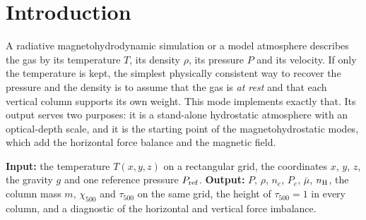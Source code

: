 


\begin{abstract}
\noindent Given the temperature of a three-dimensional piece of the solar atmosphere on a grid of geometric heights, this
mode computes the gas pressure, the density, the electron density, the 500\,nm extinction and the optical depth at every
grid point. It does so by treating every vertical column of the grid as an isolated, static column of gas that carries its
own weight (hydrostatic equilibrium), with the same prescribed pressure at one level of every column. The equation of
state includes ionisation and molecules. The equation solved, its boundary condition, the numerical integration, the
accuracy control, the computation of the optical depth and the assumptions are derived and explained step by step, as
well as what the result does not satisfy: horizontal force balance.
\end{abstract}

\section{Introduction}
A radiative magnetohydrodynamic simulation or a model atmosphere describes the gas by its temperature $T$, its density
$\rho$, its pressure $P$ and its velocity. If only the temperature is kept, the simplest physically consistent way to
recover the pressure and the density is to assume that the gas is \emph{at rest} and that each vertical column supports its
own weight. This mode implements exactly that. Its output serves two purposes: it is a stand-alone hydrostatic
atmosphere with an optical-depth scale, and it is the starting point of the magnetohydrostatic modes, which add the
horizontal force balance and the magnetic field.

\textbf{Input:} the temperature $T(x,y,z)$ on a rectangular grid, the coordinates $x$, $y$, $z$, the gravity $g$ and one
reference pressure $P_{\rm ref}$. \textbf{Output:} $P$, $\rho$, $n_e$, $P_e$, $\bar\mu$, $n_{\rm H}$, the column mass $m$,
$\chi_{500}$ and $\tau_{500}$ on the same grid, the height of $\tau_{500}=1$ in every column, and a diagnostic of the
horizontal and vertical force imbalance.

